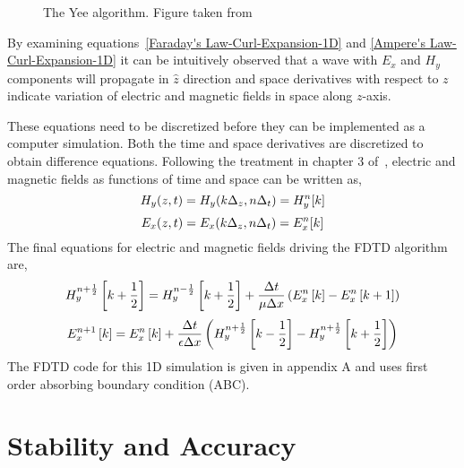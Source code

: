 \documentclass{report}
\begin{document}
\begin{figure}[here]
\centering
\caption{The Yee algorithm. Figure taken from~\cite{JBSchneiderUFDTD}}
\label{Algorithm}
\end{figure}

By examining equations~\ref{Faraday's Law-Curl-Expansion-1D} and \ref{Ampere's Law-Curl-Expansion-1D} it can be intuitively observed that a wave with $E_x$ and $H_y$ components will propagate in $\hat{z}$ direction and space derivatives with respect to $z$ indicate variation of electric and magnetic fields in space along $z$-axis.

These equations need to be discretized before they can be implemented as a computer simulation. Both the time and space derivatives are discretized to obtain difference equations. Following the treatment in chapter 3 of~\cite{JBSchneiderUFDTD}, electric and magnetic fields as functions of time and space can be written as,
\begin{equation}
\centering
H_y (z,t)=H_y (k\Delta _z,n\Delta _t)=H^n_y[k]
\label{Hy-of-z_and_t}
\end{equation}
\begin{equation}
\centering
E_x (z,t)=E_x (k\Delta _z,n\Delta _t)=E^n_x[k]
\label{Ex-of-z_and_t}
\end{equation}
The final equations for electric and magnetic fields driving the FDTD algorithm are,
\begin{equation}
\centering
H^{n+\frac{1}{2}}_y \left[k+\frac{1}{2}\right]=H^{n-\frac{1}{2}}_y \left[k+\frac{1}{2}\right] + \dfrac{\Delta t}{\mu \Delta x} \left( E^{n}_x \left[k\right] - E^{n}_x \left[k+1\right] \right)
\label{Hy-1D-Simple-FDTD-Driver}
\end{equation}
\begin{equation}
\centering
E^{n+1}_x \left[k\right]=E^{n}_x \left[k\right] + \dfrac{\Delta t}{\epsilon \Delta x} \left( H^{n+\frac{1}{2}}_y \left[k-\frac{1}{2}\right] - H^{n+\frac{1}{2}}_y \left[k+\frac{1}{2}\right] \right)
\label{Ex-1D-Simple-FDTD-Driver}
\end{equation}
The FDTD code for this 1D simulation is given in appendix A and uses first order absorbing boundary condition (ABC).

\section{Stability and Accuracy}
\end{document}
